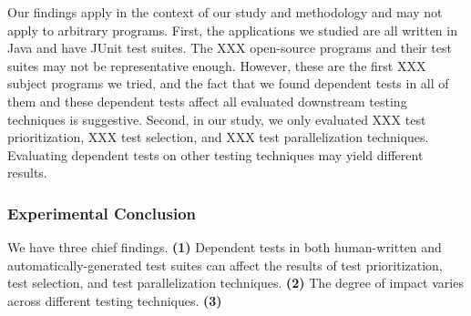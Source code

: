 Our findings apply in the context of our
study and methodology and may not apply to arbitrary
programs. First, the applications we studied are all written
in Java and have JUnit test suites.
The XXX open-source programs and
their test suites may not be representative enough.
However, these are the first XXX subject programs we
tried, and the fact that we found dependent tests in all of
them and these dependent tests affect all evaluated
downstream testing techniques is suggestive.
Second, in our study, we only evaluated XXX
test prioritization, XXX test selection, and
XXX test parallelization techniques. Evaluating
dependent tests on other testing techniques
may yield different results.

\subsubsection{Experimental Conclusion}

We have three chief findings. \textbf{(1)}
Dependent tests in both human-written
and automatically-generated test suites
can affect the results of test prioritization,
test selection, and test parallelization
techniques. \textbf{(2)} The degree of 
impact varies across different testing
techniques. 
\textbf{(3)} 
